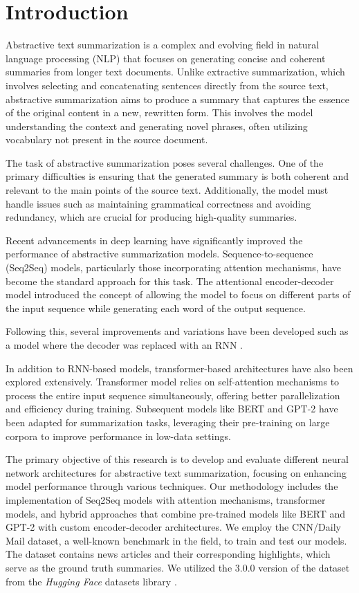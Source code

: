 \section{Introduction}
Abstractive text summarization is a complex and evolving field in natural language processing (NLP) that focuses on generating concise and coherent summaries from longer text documents. Unlike extractive summarization, which involves selecting and concatenating sentences directly from the source text, abstractive summarization aims to produce a summary that captures the essence of the original content in a new, rewritten form. This involves the model understanding the context and generating novel phrases, often utilizing vocabulary not present in the source document.

The task of abstractive summarization poses several challenges. One of the primary difficulties is ensuring that the generated summary is both coherent and relevant to the main points of the source text. Additionally, the model must handle issues such as maintaining grammatical correctness and avoiding redundancy, which are crucial for producing high-quality summaries.

Recent advancements in deep learning have significantly improved the performance of abstractive summarization models. Sequence-to-sequence (Seq2Seq) models, particularly those incorporating attention mechanisms, have become the standard approach for this task. The attentional encoder-decoder model \cite{bahdanau2014neural} introduced the concept of allowing the model to focus on different parts of the input sequence while generating each word of the output sequence.

Following this, several improvements and variations have been developed such as a model where the decoder was replaced with an RNN \cite{Chopra2016AbstractiveSS}. 

In addition to RNN-based models, transformer-based architectures have also been explored extensively. Transformer model \cite{transformer} relies on self-attention mechanisms to process the entire input sequence simultaneously, offering better parallelization and efficiency during training. Subsequent models like BERT \cite{devlin2018bert} and GPT-2 \cite{radford2019language} have been adapted for summarization tasks, leveraging their pre-training on large corpora to improve performance in low-data settings.

The primary objective of this research is to develop and evaluate different neural network architectures for abstractive text summarization, focusing on enhancing model performance through various techniques. Our methodology includes the implementation of Seq2Seq models with attention mechanisms, transformer models, and hybrid approaches that combine pre-trained models like BERT and GPT-2 with custom encoder-decoder architectures. We employ the CNN/Daily Mail dataset, a well-known benchmark in the field, to train and test our models. The dataset contains news articles and their corresponding highlights, which serve as the ground truth summaries. We utilized the 3.0.0 version of the dataset from the \textit{Hugging Face} datasets library \cite{huggingface_cnn_dailymail}.

